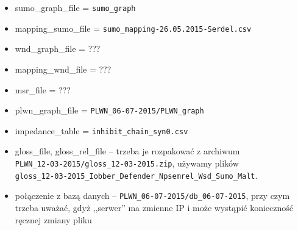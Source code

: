 \documentclass[10pt,a4paper]{article}
\begin{document}
\begin{itemize}
	\item sumo\_graph\_file = \texttt{sumo\_graph}
	\item mapping\_sumo\_file = \texttt{sumo\_mapping-26.05.2015-Serdel.csv}
	\item wnd\_graph\_file = ???  %
	\item mapping\_wnd\_file = ???
	\item msr\_file = ???
	\item plwn\_graph\_file = \texttt{PLWN\_06-07-2015/PLWN\_graph}
	\item impedance\_table = \texttt{inhibit\_chain\_syn0.csv}
	\item gloss\_file, gloss\_rel\_file -- trzeba je rozpakować z archiwum \\
		\texttt{PLWN\_12-03-2015/gloss\_12-03-2015.zip}, używamy plików \\ \texttt{gloss\_12-03-2015\_Iobber\_Defender\_Npsemrel\_Wsd\_Sumo\_Malt}.
	\item połączenie z bazą danych -- \texttt{PLWN\_06-07-2015/db\_06-07-2015}, przy czym trzeba uważać, gdyż ,,serwer'' ma zmienne IP i może wystąpić konieczność ręcznej zmiany pliku

\end{itemize}




\end{document}
